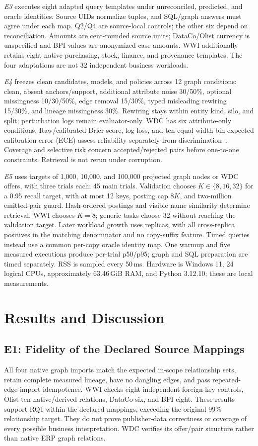 \documentclass[conference,letterpaper]{IEEEtran}
\begin{document}
\emph{E3} executes eight adapted query templates under unreconciled, predicted, and oracle identities. Source UIDs normalize tuples, and SQL/graph answers must agree under each map. Q2/Q4 are source-local controls; the other six depend on reconciliation. Amounts are cent-rounded source units; DataCo/Olist currency is unspecified and BPI values are anonymized case amounts. WWI additionally retains eight native purchasing, stock, finance, and provenance templates. The four adaptations are not 32 independent business workloads.

\emph{E4} freezes clean candidates, models, and policies across 12 graph conditions: clean, absent anchors/support, additional attribute noise 30/50\%, optional missingness 10/30/50\%, edge removal 15/30\%, typed misleading rewiring 15/30\%, and lineage missingness 30\%. Rewiring stays within entity kind, silo, and split; perturbation logs remain evaluator-only. WDC has six attribute-only conditions. Raw/calibrated Brier score, log loss, and ten equal-width-bin expected calibration error (ECE) assess reliability separately from discrimination~\cite{calibration2005}. Coverage and selective risk concern accepted/rejected pairs before one-to-one constraints. Retrieval is not rerun under corruption.

\emph{E5} uses targets of 1,000, 10,000, and 100,000 projected graph nodes or WDC offers, with three trials each: 45 main trials. Validation chooses $K\in\{8,16,32\}$ for a 0.95 recall target, with at most 12 keys, posting cap $8K$, and two-million emitted-pair guard. Hash-ordered postings and visible name similarity determine retrieval. WWI chooses $K=8$; generic tasks choose 32 without reaching the validation target. Later workload growth uses replicas, with all cross-replica positives in the matching denominator and no copy-suffix feature. Timed queries instead use a common per-copy oracle identity map. One warmup and five measured executions produce per-trial p50/p95; graph and SQL preparation are timed separately. RSS is sampled every 50\,ms. Hardware is Windows 11, 24 logical CPUs, approximately 63.46\,GiB RAM, and Python 3.12.10; these are local measurements.

\section{Results and Discussion}
\label{sec:results}
\subsection{E1: Fidelity of the Declared Source Mappings}
All four native graph imports match the expected in-scope relationship sets, retain complete measured lineage, have no dangling edges, and pass repeated-edge-import idempotence. WWI checks eight independent foreign-key controls, Olist ten native/derived relations, DataCo six, and BPI eight. These results support RQ1 within the declared mappings, exceeding the original 99\% relationship target. They do not prove publisher-data correctness or coverage of every possible business interpretation. WDC verifies its offer/pair structure rather than native ERP graph relations.
\end{document}
